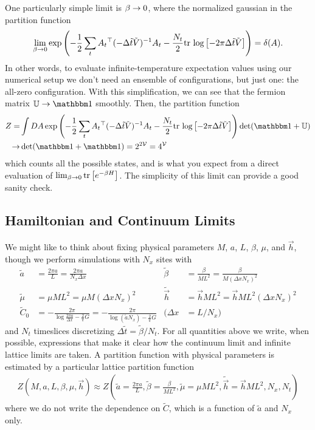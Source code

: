 One particularly simple limit is $\beta\rightarrow0$, where the normalized gaussian in the partition function
\begin{align}
	\lim_{\beta\rightarrow0} \exp\left(-\frac{1}{2} \sum_t A_t{}^{\top} (-\Delta\tilde{t}\tilde{V})^{-1} A_t - \frac{N_t}{2} \text{tr log}\left[ -2\pi \Delta\tilde{t}\tilde{V} \right]\right)
	=
	\delta( A ).
\end{align}
In other words, to evaluate infinite-temperature expectation values using our numerical setup we don't need an ensemble of configurations, but just one: the all-zero configuration.
With this simplification, we can see that the fermion matrix $\UU \goesto \one$ smoothly.
Then, the partition function
\begin{align}
	Z
	=&
	\int DA \exp\left(-\half \sum_t A_t\transpose (-\Delta\tilde{t}\tilde{V})\inverse A_t - \frac{N_t}{2} \trlog{ -2\pi \Delta\tilde{t}\tilde{V} }\right) \det(\one+\UU)
	\nonumber\\
	\goesto&
	\det(\one+\one) = 2^{2\Volume} = 4^\Volume
\end{align}
which counts all the possible states, and is what you expect from a direct evaluation of $\lim_{\beta\rightarrow0}\text{tr}\left[e^{-\beta H}\right]$.
The simplicity of this limit can provide a good sanity check.

\subsection{Hamiltonian and Continuum Limits}\label{sec:continuum limit}

We might like to think about fixing physical parameters $M$, $a$, $L$, $\beta$, $\mu$, and $\vec{h}$, though we perform simulations with $N_x$ sites with
\begin{align}
    \tilde{a} &= \frac{2\pi a}{L} = \frac{2\pi a}{N_x \Delta x}
    &
    \tilde{\beta} &= \frac{\beta}{M L^2} = \frac{\beta}{M(\Delta x N_x)^2}
    \nonumber\\
    \tilde{\mu} &= \mu M L^2 = \mu M (\Delta x N_x)^2
    &
    \tilde{\vec{h}} &= \vec{h} M L^2 = \vec{h} ML^2 (\Delta x N_x)^2
    \\\nonumber
    \tilde{C}_0 &
        = - \frac{2\pi}{\log \frac{2\pi a}{\Delta x} - \frac{2}{\pi} G}
        = - \frac{2\pi}{\log (\tilde{a} N_x) - \frac{2}{\pi} G}
    &
    (\Delta x &= L/N_x)
\end{align}
and $N_t$ timeslices discretizing $\Delta\tilde{t} = \tilde{\beta}/N_t$.
For all quantities above we write, when possible, expressions that make it clear how the continuum limit and infinite lattice limits are taken.
A partition function with physical parameters is estimated by a particular lattice partition function
\begin{align}
    Z\left(M, a, L, \beta, \mu, \vec{h}\right) \approx Z\left(\tilde{a} = \frac{2\pi a}{L}, \tilde{\beta} = \frac{\beta}{ML^2}, \tilde{\mu} = \mu ML^2, \tilde{\vec{h}} = \vec{h}ML^2, N_x, N_t \right)
\end{align}
where we do not write the dependence on $\tilde{C}$, which is a function of $\tilde{a}$ and $N_x$ only.

